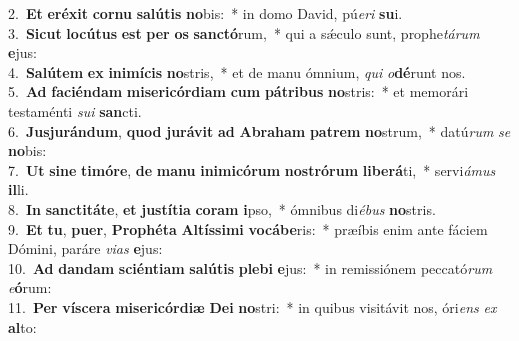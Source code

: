 {2.~}\textbf{Et} \textbf{e}\textbf{ré}\textbf{xit} \textbf{cor}\textbf{nu} \textbf{sa}\textbf{lú}\textbf{tis} \textbf{no}bis:~* in domo David, pú\textit{e}\textit{ri} \textbf{su}i.\\
{3.~}\textbf{Si}\textbf{cut} \textbf{lo}\textbf{cú}\textbf{tus} \textbf{est} \textbf{per} \textbf{os} \textbf{san}\textbf{ctó}rum,~* qui a sǽculo sunt, prophe\textit{tá}\textit{rum} \textbf{e}jus:\\
{4.~}\textbf{Sa}\textbf{lú}\textbf{tem} \textbf{ex} \textbf{i}\textbf{ni}\textbf{mí}\textbf{cis} \textbf{no}stris,~* et de manu ómnium, \textit{qui} \textit{o}\textbf{dé}runt nos.\\
{5.~}\textbf{Ad} \textbf{fa}\textbf{ci}\textbf{én}\textbf{dam} \textbf{mi}\textbf{se}\textbf{ri}\textbf{cór}\textbf{di}\textbf{am} \textbf{cum} \textbf{pá}\textbf{tri}\textbf{bus} \textbf{no}stris:~* et memorári testaménti \textit{su}\textit{i} \textbf{san}cti.\\
{6.~}\textbf{Jus}\textbf{ju}\textbf{rán}\textbf{dum}, \textbf{quod} \textbf{ju}\textbf{rá}\textbf{vit} \textbf{ad} \textbf{A}\textbf{bra}\textbf{ham} \textbf{pa}\textbf{trem} \textbf{no}strum,~* datú\textit{rum} \textit{se} \textbf{no}bis:\\
{7.~}\textbf{Ut} \textbf{si}\textbf{ne} \textbf{ti}\textbf{mó}\textbf{re}, \textbf{de} \textbf{ma}\textbf{nu} \textbf{i}\textbf{ni}\textbf{mi}\textbf{có}\textbf{rum} \textbf{no}\textbf{stró}\textbf{rum} \textbf{li}\textbf{be}\textbf{rá}ti,~* servi\textit{á}\textit{mus} \textbf{il}li.\\
{8.~}\textbf{In} \textbf{san}\textbf{cti}\textbf{tá}\textbf{te}, \textbf{et} \textbf{ju}\textbf{stí}\textbf{ti}\textbf{a} \textbf{co}\textbf{ram} \textbf{i}pso,~* ómnibus di\textit{é}\textit{bus} \textbf{no}stris.\\
{9.~}\textbf{Et} \textbf{tu}, \textbf{pu}\textbf{er}, \textbf{Pro}\textbf{phé}\textbf{ta} \textbf{Al}\textbf{tís}\textbf{si}\textbf{mi} \textbf{vo}\textbf{cá}\textbf{be}ris:~* præíbis enim ante fáciem Dómini, paráre \textit{vi}\textit{as} \textbf{e}jus:\\
{10.~}\textbf{Ad} \textbf{dan}\textbf{dam} \textbf{sci}\textbf{én}\textbf{ti}\textbf{am} \textbf{sa}\textbf{lú}\textbf{tis} \textbf{ple}\textbf{bi} \textbf{e}jus:~* in remissiónem peccató\textit{rum} \textit{e}\textbf{ó}rum:\\
{11.~}\textbf{Per} \textbf{ví}\textbf{sce}\textbf{ra} \textbf{mi}\textbf{se}\textbf{ri}\textbf{cór}\textbf{di}\textbf{æ} \textbf{De}\textbf{i} \textbf{no}stri:~* in quibus visitávit nos, óri\textit{ens} \textit{ex} \textbf{al}to:\\
